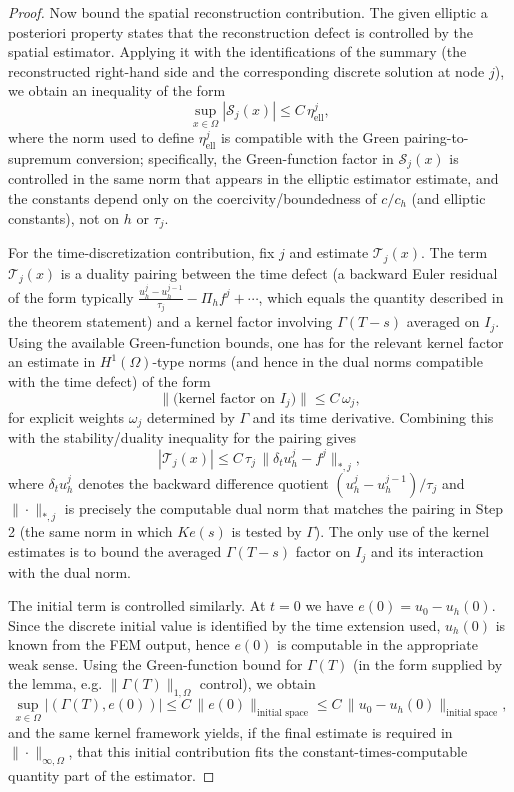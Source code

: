 \documentclass[11pt]{article}
\begin{document}
\begin{proof}
Now bound the spatial reconstruction contribution. The given elliptic a posteriori property states that the reconstruction defect is controlled by the spatial estimator. Applying it with the identifications of the summary (the reconstructed right-hand side and the corresponding discrete solution at node $j$), we obtain an inequality of the form
\[
\sup_{x\in\Omega}|\mathcal S_j(x)|\le C\,\eta_\mathrm{ell}^j,
\]
where the norm used to define $\eta_\mathrm{ell}^j$ is compatible with the Green pairing-to-supremum conversion; specifically, the Green-function factor in $\mathcal S_j(x)$ is controlled in the same norm that appears in the elliptic estimator estimate, and the constants depend only on the coercivity/boundedness of $c/c_h$ (and elliptic constants), not on $h$ or $\tau_j$.

For the time-discretization contribution, fix $j$ and estimate $\mathcal T_j(x)$. The term $\mathcal T_j(x)$ is a duality pairing between the time defect (a backward Euler residual of the form typically $\frac{u_h^j-u_h^{j-1}}{\tau_j}-\Pi_h f^j+\cdots$, which equals the quantity described in the theorem statement) and a kernel factor involving $\Gamma(T-s)$ averaged on $I_j$. Using the available Green-function bounds, one has for the relevant kernel factor an estimate in $H^1(\Omega)$-type norms (and hence in the dual norms compatible with the time defect) of the form
\[
\|\text{(kernel factor on }I_j\text{)}\|\le C\,\omega_j,
\]
for explicit weights $\omega_j$ determined by $\Gamma$ and its time derivative. Combining this with the stability/duality inequality for the pairing gives
\[
|\mathcal T_j(x)|\le C\,\tau_j\,\|\delta_t u_h^j - f^j\|_{\ast,j},
\]
where $\delta_t u_h^j$ denotes the backward difference quotient $(u_h^j-u_h^{j-1})/\tau_j$ and $\|\cdot\|_{\ast,j}$ is precisely the computable dual norm that matches the pairing in Step 2 (the same norm in which $K e(s)$ is tested by $\Gamma$). The only use of the kernel estimates is to bound the averaged $\Gamma(T-s)$ factor on $I_j$ and its interaction with the dual norm.

The initial term is controlled similarly. At $t=0$ we have $e(0)=u_0-u_h(0)$. Since the discrete initial value is identified by the time extension used, $u_h(0)$ is known from the FEM output, hence $e(0)$ is computable in the appropriate weak sense. Using the Green-function bound for $\Gamma(T)$ (in the form supplied by the lemma, e.g. $\|\Gamma(T)\|_{1,\Omega}$ control), we obtain
\[
\sup_{x\in\Omega}|(\Gamma(T),e(0))|\le C\,\|e(0)\|_{\text{initial space}}\le C\,\|u_0-u_h(0)\|_{\text{initial space}},
\]
and the same kernel framework yields, if the final estimate is required in $\|\cdot\|_{\infty,\Omega}$, that this initial contribution fits the constant-times-computable quantity part of the estimator.


\end{proof}
\end{document}
